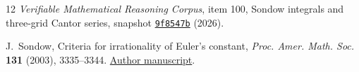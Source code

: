 \documentclass[11pt]{article}
\numberwithin{equation}{section}
\theoremstyle{remark}
\begin{document}
\begin{thebibliography}{12}
\emph{Verifiable Mathematical Reasoning Corpus}, item 100,
Sondow integrals and three-grid Cantor series,
snapshot \href{https://github.com/QEEDDD/Verifiable-Mathematical-Reasoning-Corpus/tree/9f8547bfd3b8f6560f20c1b63028dc87a07a2e33}{\texttt{9f8547b}} (2026).

J.~Sondow, Criteria for irrationality of Euler's constant,
\emph{Proc. Amer. Math. Soc.} \textbf{131} (2003), 3335--3344.
\href{https://arxiv.org/abs/math/0209070}{Author manuscript}.

\end{thebibliography}
\end{document}
